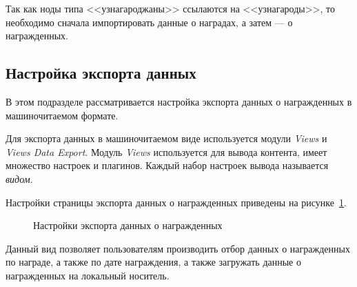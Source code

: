 Так как ноды типа <<узнагароджаны>> ссылаются на <<узнагароды>>, то
необходимо сначала импортировать данные о наградах, а затем --- о награжденных.

\subsection{Настройка экспорта данных}
\label{ssec:export_setup}

В этом подразделе рассматривается настройка экспорта данных о награжденных в 
машиночитаемом формате.

Для экспорта данных в машиночитаемом виде используется модули
\textit{Views} и \textit{Views Data Export}.
Модуль \textit{Views} используется для вывода контента, имеет множество настроек и 
плагинов. Каждый набор настроек вывода называется \textit{видом}.

Настройки страницы экспорта данных о награжденных приведены
на рисунке~\ref{fig:awarded_export}.

\begin{figure}[h]
  \centering
  {
    \setlength{\fboxsep}{0pt}%
    \setlength{\fboxrule}{1pt}%
  }
  \caption{Настройки экспорта данных о награжденных}
  \label{fig:awarded_export}
\end{figure}

Данный вид позволяет пользователям производить отбор данных о награжденных
по награде, а также по дате награждения, а также загружать данные о награжденных
на локальный носитель.
